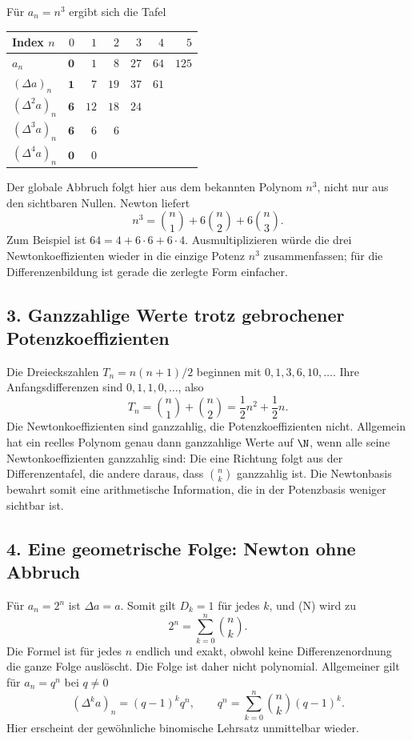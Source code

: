 Für $a_n=n^3$ ergibt sich die Tafel
\begin{center}
\begin{tabular}{@{}lrrrrrr@{}}
\toprule
Index $n$ & $0$ & $1$ & $2$ & $3$ & $4$ & $5$\\
\midrule
$a_n$            & $\mathbf0$ & $1$ & $8$ & $27$ & $64$ & $125$\\
$(\Delta a)_n$   & $\mathbf1$ & $7$ & $19$ & $37$ & $61$ &\\
$(\Delta^2a)_n$  & $\mathbf6$ & $12$ & $18$ & $24$ & &\\
$(\Delta^3a)_n$  & $\mathbf6$ & $6$ & $6$ & & &\\
$(\Delta^4a)_n$  & $\mathbf0$ & $0$ & & & &\\
\bottomrule
\end{tabular}
\end{center}
Der globale Abbruch folgt hier aus dem bekannten Polynom $n^3$,
nicht nur aus den sichtbaren Nullen. Newton liefert
\[
 n^3=\binom n1+6\binom n2+6\binom n3.
\]
Zum Beispiel ist $64=4+6\cdot6+6\cdot4$.
Ausmultiplizieren würde die drei Newtonkoeffizienten wieder in
die einzige Potenz $n^3$ zusammenfassen; für die Differenzenbildung
ist gerade die zerlegte Form einfacher.

\subsection*{3. Ganzzahlige Werte trotz gebrochener Potenzkoeffizienten}

Die Dreieckszahlen $T_n=n(n+1)/2$ beginnen mit $0,1,3,6,10,\ldots$.
Ihre Anfangsdifferenzen sind $0,1,1,0,\ldots$, also
\[
 T_n=\binom n1+\binom n2=\frac12n^2+\frac12n.
\]
Die Newtonkoeffizienten sind ganzzahlig, die Potenzkoeffizienten nicht.
Allgemein hat ein reelles Polynom genau dann ganzzahlige Werte auf
$\N$, wenn alle seine Newtonkoeffizienten ganzzahlig sind:
Die eine Richtung folgt aus der Differenzentafel, die andere daraus,
dass $\binom nk$ ganzzahlig ist. Die Newtonbasis bewahrt somit eine
arithmetische Information, die in der Potenzbasis weniger sichtbar ist.

\subsection*{4. Eine geometrische Folge: Newton ohne Abbruch}

Für $a_n=2^n$ ist $\Delta a=a$. Somit gilt $D_k=1$ für jedes $k$,
und (N) wird zu
\[
 2^n=\sum_{k=0}^n\binom nk.
\]
Die Formel ist für jedes $n$ endlich und exakt, obwohl keine
Differenzenordnung die ganze Folge auslöscht. Die Folge ist daher
nicht polynomial. Allgemeiner gilt für $a_n=q^n$ bei $q\ne0$
\[
 (\Delta^ka)_n=(q-1)^kq^n,\qquad
 q^n=\sum_{k=0}^n\binom nk(q-1)^k.
\]
Hier erscheint der gewöhnliche binomische Lehrsatz unmittelbar wieder.

